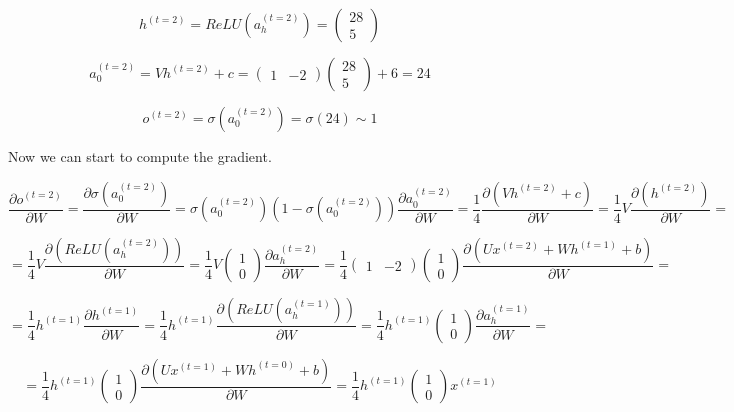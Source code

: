 $$ h^{(t=2)} = ReLU \left( a_h^{(t=2)} \right) = \begin{pmatrix} 28 \\ 5 \end{pmatrix} $$

$$ a_0^{(t=2)} = V h^{(t=2)} + c = \begin{pmatrix} 1 & -2 \end{pmatrix} \begin{pmatrix} 28 \\ 5 \end{pmatrix} + 6 = 24 $$

$$ o^{(t=2)} = \sigma \left( a_0^{(t=2)}  \right) = \sigma(24) \sim 1 $$

\noindent Now we can start to compute the gradient.

$$ \frac{\partial o^{(t=2)}}{\partial W} = \frac{\partial \sigma \left( a_0^{(t=2)} \right)}{\partial W} = \sigma \left( a_0^{(t=2)} \right) \left(  1 - \sigma \left( a_0^{(t=2)} \right) \right) \frac{\partial a_0^{(t=2)}}{\partial W} = \frac{1}{4} \frac{\partial (V h^{(t=2)} + c)}{\partial W} = \frac{1}{4} V  \frac{\partial (h^{(t=2)})}{\partial W} =  $$

$$ = \frac{1}{4} V  \frac{\partial \left(ReLU \left(a_h^{(t=2)} \right)\right)}{\partial W} = \frac{1}{4} V \begin{pmatrix} 1 \\ 0 \end{pmatrix} \frac{\partial a_h^{(t=2)} }{\partial W} = \frac{1}{4} \begin{pmatrix} 1 & -2 \end{pmatrix} \begin{pmatrix} 1 \\ 0 \end{pmatrix} \frac{\partial \left( Ux^{(t=2)} + W h^{(t=1)} + b \right) }{\partial W} = $$ 

$$ = \frac{1}{4} h^{(t=1)} \frac{\partial h^{(t=1)}}{\partial W} =  \frac{1}{4} h^{(t=1)} \frac{\partial \left(ReLU \left(a_h^{(t=1)} \right)\right)}{\partial W} = \frac{1}{4} h^{(t=1)}  \begin{pmatrix} 1 \\ 0 \end{pmatrix} \frac{\partial a_h^{(t=1)} }{\partial W} = $$

$$ = \frac{1}{4} h^{(t=1)}  \begin{pmatrix} 1 \\ 0 \end{pmatrix} \frac{\partial \left( Ux^{(t=1)} + W h^{(t=0)} + b \right) }{\partial W}  = \frac{1}{4} h^{(t=1)} \begin{pmatrix} 1 \\ 0 \end{pmatrix} x^{(t=1)} $$


